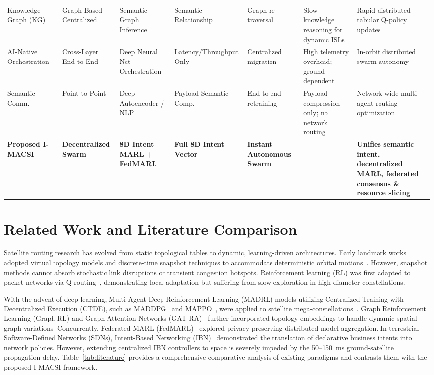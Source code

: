 \documentclass[journal]{IEEEtran}
\begin{document}
\begin{table}[t]
{\begin{tabular}{p{3.2cm}p{2.5cm}p{3.0cm}p{2.4cm}p{2.5cm}p{4cm}p{4.2cm}}
Knowledge Graph (KG)~\cite{chen2022knowledge} & Graph-Based Centralized & Semantic Graph Inference & Semantic Relationship & Graph re-traversal & Slow knowledge reasoning for dynamic ISLs & Rapid distributed tabular Q-policy updates \\
AI-Native Orchestration~\cite{tang2020deep} & Cross-Layer End-to-End & Deep Neural Net Orchestration & Latency/Throughput Only & Centralized migration & High telemetry overhead; ground dependent & In-orbit distributed swarm autonomy \\
Semantic Comm.~\cite{qin2021semantic} & Point-to-Point & Deep Autoencoder / NLP & Payload Semantic Comp. & End-to-end retraining & Payload compression only; no network routing & Network-wide multi-agent routing optimization \\
\midrule
\textbf{Proposed I-MACSI} & \textbf{Decentralized Swarm} & \textbf{8D Intent MARL + FedMARL} & \textbf{Full 8D Intent Vector} & \textbf{Instant Autonomous Swarm} & \textbf{---} & \textbf{Unifies semantic intent, decentralized MARL, federated consensus \& resource slicing} \\
\bottomrule
\end{tabular}%
}
\end{table}

\section{Related Work and Literature Comparison}
Satellite routing research has evolved from static topological tables to dynamic, learning-driven architectures. Early landmark works adopted virtual topology models and discrete-time snapshot techniques to accommodate deterministic orbital motions~\cite{qu2022leo}. However, snapshot methods cannot absorb stochastic link disruptions or transient congestion hotspots. Reinforcement learning (RL) was first adapted to packet networks via Q-routing~\cite{liu2023task}, demonstrating local adaptation but suffering from slow exploration in high-diameter constellations.

With the advent of deep learning, Multi-Agent Deep Reinforcement Learning (MADRL) models utilizing Centralized Training with Decentralized Execution (CTDE), such as MADDPG~\cite{cui2022multi} and MAPPO~\cite{zhu2021cooperative}, were applied to satellite mega-constellations~\cite{sheng2022hierarchical}. Graph Reinforcement Learning (Graph RL) and Graph Attention Networks (GAT-RA)~\cite{suarez2023graph, shen2023graph} further incorporated topology embeddings to handle dynamic spatial graph variations. Concurrently, Federated MARL (FedMARL)~\cite{chen2022satellite} explored privacy-preserving distributed model aggregation. In terrestrial Software-Defined Networks (SDNs), Intent-Based Networking (IBN)~\cite{pang2023intent} demonstrated the translation of declarative business intents into network policies. However, extending centralized IBN controllers to space is severely impeded by the 50--150~ms ground-satellite propagation delay. Table~\ref{tab:literature} provides a comprehensive comparative analysis of existing paradigms and contrasts them with the proposed I-MACSI framework.
\end{document}
